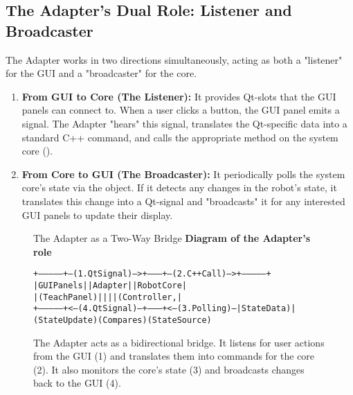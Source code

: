 \subsection{The Adapter's Dual Role: Listener and Broadcaster}
\label{subsec:adapter_dual_role}

The Adapter works in two directions simultaneously, acting as both a "listener" for the GUI and a "broadcaster" for the core.

\begin{enumerate}
    \item \textbf{From GUI to Core (The Listener):} It provides Qt-slots that the GUI panels can connect to. When a user clicks a button, the GUI panel emits a signal. The Adapter "hears" this signal, translates the Qt-specific data into a standard C++ command, and calls the appropriate method on the system core ().
    \item \textbf{From Core to GUI (The Broadcaster):} It periodically polls the system core's state via the  object. If it detects any changes in the robot's state, it translates this change into a Qt-signal and "broadcasts" it for any interested GUI panels to update their display.
\end{enumerate}

\begin{figure}[h!]
    \centering
    \begin{infobox}{The Adapter as a Two-Way Bridge}
        \textbf{Diagram of the Adapter's role}

        {\footnotesize
        \begin{alltt}
+--------------+ --(1. Qt Signal)--> +---------+ --(2. C++ Call)--> +---------------+
|  GUI Panels  |                     | Adapter |                    |  Robot Core   |
| (TeachPanel) |                     |         |                    | (Controller,  |
+--------------+ <--(4. Qt Signal)-- +---------+ <--(3. Polling)--  |   StateData)  |
 (State Update)                      (Compares)                      (State Source)
        \end{alltt}
        }
    \end{infobox}
            \vspace{0.3cm}
    \caption{The Adapter acts as a bidirectional bridge. It listens for user actions from the GUI (1) and translates them into commands for the core (2). It also monitors the core's state (3) and broadcasts changes back to the GUI (4).}
    \label{fig:adapter_role}
\end{figure}

